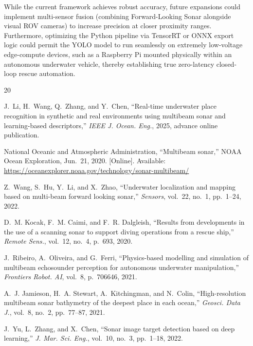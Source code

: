 \documentclass[conference]{IEEEtran}
\begin{document}
While the current framework achieves robust accuracy, future expansions could implement multi-sensor fusion (combining Forward-Looking Sonar alongside visual ROV cameras) to increase precision at closer proximity ranges. Furthermore, optimizing the Python pipeline via TensorRT or ONNX export logic could permit the YOLO model to run seamlessly on extremely low-voltage edge-compute devices, such as a Raspberry Pi mounted physically within an autonomous underwater vehicle, thereby establishing true zero-latency closed-loop rescue automation.


\begin{thebibliography}{20}

J.~Li, H.~Wang, Q.~Zhang, and Y.~Chen, ``Real-time underwater place recognition in synthetic and real environments using multibeam sonar and learning-based descriptors,'' \textit{IEEE J. Ocean. Eng.}, 2025, advance online publication.

National Oceanic and Atmospheric Administration, ``Multibeam sonar,'' NOAA Ocean Exploration, Jun.~21, 2020. [Online]. Available: \url{https://oceanexplorer.noaa.gov/technology/sonar-multibeam/}

Z.~Wang, S.~Hu, Y.~Li, and X.~Zhao, ``Underwater localization and mapping based on multi-beam forward looking sonar,'' \textit{Sensors}, vol.~22, no.~1, pp.~1--24, 2022.

D.~M. Kocak, F.~M. Caimi, and F.~R. Dalgleish, ``Results from developments in the use of a scanning sonar to support diving operations from a rescue ship,'' \textit{Remote Sens.}, vol.~12, no.~4, p.~693, 2020.

J.~Ribeiro, A.~Oliveira, and G.~Ferri, ``Physics-based modelling and simulation of multibeam echosounder perception for autonomous underwater manipulation,'' \textit{Frontiers Robot. AI}, vol.~8, p.~706646, 2021.

A.~J. Jamieson, H.~A. Stewart, A.~Kitchingman, and N.~Colin, ``High-resolution multibeam sonar bathymetry of the deepest place in each ocean,'' \textit{Geosci. Data J.}, vol.~8, no.~2, pp.~77--87, 2021.

J.~Yu, L.~Zhang, and X.~Chen, ``Sonar image target detection based on deep learning,'' \textit{J. Mar. Sci. Eng.}, vol.~10, no.~3, pp.~1--18, 2022.


\end{thebibliography}
\end{document}
